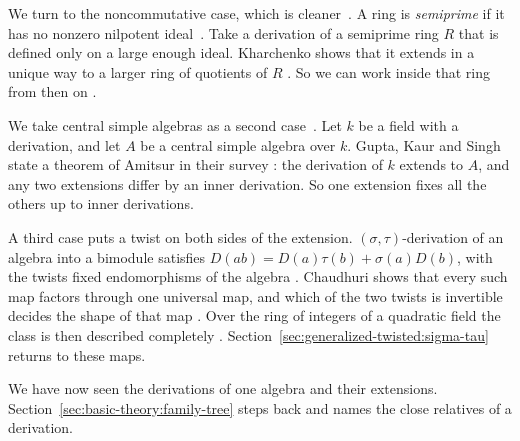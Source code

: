We turn to the noncommutative case, which is cleaner~\cite[\S1.8.2, p.~51]{Kharchenko1991}. A ring is
\emph{semiprime} if it has no nonzero nilpotent ideal~\cite[Definition~1.1.1,
p.~2]{Kharchenko1991}. Take a derivation of a semiprime ring $R$ that is
defined only on a large enough ideal. Kharchenko shows that it extends in a
unique way to a larger ring of quotients of $R$ \cite[Proposition~1.8.1,
p.~50]{Kharchenko1991}. So we can work inside that ring from then on
\cite[\S1.8.2, p.~51]{Kharchenko1991}.

We take central simple algebras as a second case~\cite[Theorem~3.1]{GuptaKaurSingh2023}. Let $k$ be a field with a
derivation, and let $A$ be a central simple algebra over $k$. Gupta, Kaur and
Singh state a theorem of Amitsur in their survey
\cite[Theorem~3.1]{GuptaKaurSingh2023}: the derivation of $k$ extends to $A$,
and any two extensions differ by an inner derivation. So one extension fixes
all the others up to inner derivations.

A third case puts a twist on both sides of the extension.
$(\sigma,\tau)$-derivation of an algebra into a bimodule satisfies
$D(ab)=D(a)\tau(b)+\sigma(a)D(b)$, with the twists fixed endomorphisms of the
algebra \cite[p.~2]{Chaudhuri2020SigmaTau}. Chaudhuri shows that every such
map factors through one universal map, and which of the two twists is
invertible decides the shape of that map \cite[Theorem~3.1,
p.~3]{Chaudhuri2020SigmaTau}. Over the ring of integers of a quadratic field
the class is then described completely \cite[Theorem~4.2,
pp.~6--7]{Chaudhuri2020SigmaTau}.
Section~\ref{sec:generalized-twisted:sigma-tau} returns to these maps.

We have now seen the derivations of one algebra and their extensions.
Section~\ref{sec:basic-theory:family-tree} steps back and names the close
relatives of a derivation.
